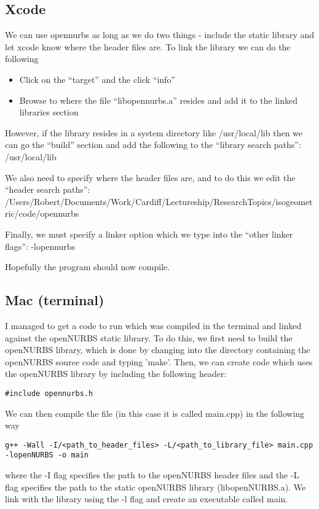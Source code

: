 \documentclass[a4paper, 10pt]{article}
\begin{document}
\subsection*{Xcode}
We can use opennurbs as long as we do two things - include the static library and let xcode know where the header files are. To link the library we can do the following
\begin{itemize}
\item Click on the ``target'' and the click ``info''
\item Browse to where the file ``libopennurbs.a'' resides and add it to the linked libraries section
\end{itemize}

However, if the library resides in a system directory like /usr/local/lib then we can go the ``build'' section and add the following to the ``library search paths'': /usr/local/lib

We also need to specify where the header files are, and to do this we edit the ``header search paths'': /Users/Robert/Documents/Work/Cardiff/Lectureship/ResearchTopics/isogeometric/code/opennurbs

Finally, we must specify a linker option which we type into the ``other linker flags'': -lopennurbs

Hopefully the program should now compile.

\subsection*{Mac (terminal)}

I managed to get a code to run which was compiled in the terminal and linked against the openNURBS static library. To do this, we first need to build the openNURBS library, which is done by changing into the directory containing the openNURBS source code and typing 'make'. Then, we can create code which uses the openNURBS library by including the following header:
\begin{verbatim}
#include opennurbs.h
\end{verbatim}
We can then compile the file (in this case it is called main.cpp) in the following way
\begin{verbatim}
g++ -Wall -I/<path_to_header_files> -L/<path_to_library_file> main.cpp -lopenNURBS -o main
\end{verbatim}
where the -I flag specifies the path to the openNURBS header files and the -L flag specifies the path to the static openNURBS library (libopenNURBS.a). We link with the library using the -l flag and create an executable called main.
\end{document}
